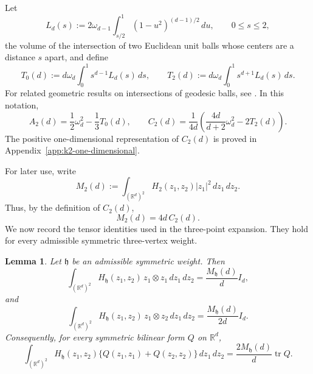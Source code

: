 \documentclass[11pt]{article}
\newtheorem{lemma}[theorem]{Lemma}
\theoremstyle{remark}
\newcommand{\R}{\mathbb R}
\numberwithin{equation}{section}
\begin{document}
Let
\[
L_d(s):=2\omega_{d-1}\int_{s/2}^{1}(1-u^2)^{(d-1)/2}\,du,
\qquad 0\le s\le2,
\]
the volume of the intersection of two Euclidean unit balls whose centers are
a distance $s$ apart, and define
\[
T_0(d):=d\omega_d\int_0^1s^{d-1}L_d(s)\,ds,
\qquad
T_2(d):=d\omega_d\int_0^1s^{d+1}L_d(s)\,ds.
\]
For related geometric results on intersections of geodesic balls, see
\cite{CsikosHorvath2011}.  In this notation,
\[
A_2(d)=\frac12\omega_d^2-\frac13T_0(d),
\qquad
C_2(d)=\frac1{4d}\left(\frac{4d}{d+2}\omega_d^2-2T_2(d)\right).
\]
The positive one-dimensional representation of $C_2(d)$ is proved in
Appendix~\ref{app:k2-one-dimensional}.

For later use, write
\[
M_2(d)
:=
\int_{(\R^d)^2}
H_2(z_1,z_2)|z_1|^2\,dz_1\,dz_2.
\]
Thus, by the definition of $C_2(d)$,
\[
M_2(d)=4d\,C_2(d).
\]
We now record the tensor identities used in the three-point expansion.
They hold for every admissible symmetric three-vertex weight.

\begin{lemma}
\label{lem:three-point-tensor-moments}
Let \(\mathfrak h\) be an admissible symmetric weight. Then
\[
\int_{(\R^d)^2}
H_{\mathfrak h}(z_1,z_2)\,
z_1\otimes z_1\,dz_1\,dz_2
=
\frac{M_{\mathfrak h}(d)}{d}I_d,
\]
and
\[
\int_{(\R^d)^2}
H_{\mathfrak h}(z_1,z_2)\,
z_1\otimes z_2\,dz_1\,dz_2
=
\frac{M_{\mathfrak h}(d)}{2d}I_d.
\]
Consequently, for every symmetric bilinear form \(Q\) on \(\R^d\),
\[
\int_{(\R^d)^2}
H_{\mathfrak h}(z_1,z_2)
\bigl\{Q(z_1,z_1)+Q(z_2,z_2)\bigr\}
\,dz_1\,dz_2
=
\frac{2M_{\mathfrak h}(d)}{d}\operatorname{tr}Q.
\]
\end{lemma}
\end{document}
